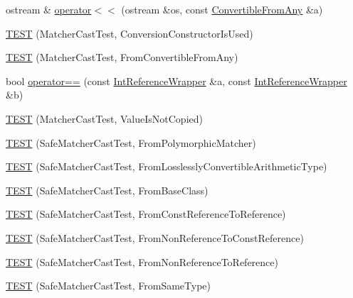 \begin{DoxyCompactItemize}
\item 
ostream \& \hyperlink{namespacetesting_1_1gmock__matchers__test_a2a2abd1e49c201ae26ed96211d4225eb}{operator$<$$<$} (ostream \&os, const \hyperlink{structtesting_1_1gmock__matchers__test_1_1_convertible_from_any}{Convertible\+From\+Any} \&a)
\item 
\hyperlink{namespacetesting_1_1gmock__matchers__test_a42e4d7d26704516436281897cb41bb1b}{T\+E\+ST} (Matcher\+Cast\+Test, Conversion\+Constructor\+Is\+Used)
\item 
\hyperlink{namespacetesting_1_1gmock__matchers__test_ae51787fccc0f0a27e3725039c6cd48dc}{T\+E\+ST} (Matcher\+Cast\+Test, From\+Convertible\+From\+Any)
\item 
bool \hyperlink{namespacetesting_1_1gmock__matchers__test_a33c068c32bf5118e5be92771b146db77}{operator==} (const \hyperlink{structtesting_1_1gmock__matchers__test_1_1_int_reference_wrapper}{Int\+Reference\+Wrapper} \&a, const \hyperlink{structtesting_1_1gmock__matchers__test_1_1_int_reference_wrapper}{Int\+Reference\+Wrapper} \&b)
\item 
\hyperlink{namespacetesting_1_1gmock__matchers__test_ae99c08c8a815964b61f98a4785cf79b5}{T\+E\+ST} (Matcher\+Cast\+Test, Value\+Is\+Not\+Copied)
\item 
\hyperlink{namespacetesting_1_1gmock__matchers__test_a29c04361c022a71711dbf9d3cf2a5050}{T\+E\+ST} (Safe\+Matcher\+Cast\+Test, From\+Polymorphic\+Matcher)
\item 
\hyperlink{namespacetesting_1_1gmock__matchers__test_a70bbe53742db988a828d9e8201e34770}{T\+E\+ST} (Safe\+Matcher\+Cast\+Test, From\+Losslessly\+Convertible\+Arithmetic\+Type)
\item 
\hyperlink{namespacetesting_1_1gmock__matchers__test_a937469149aee65efde526091af1e4f78}{T\+E\+ST} (Safe\+Matcher\+Cast\+Test, From\+Base\+Class)
\item 
\hyperlink{namespacetesting_1_1gmock__matchers__test_a14ba7c67551222321056e4da6708010f}{T\+E\+ST} (Safe\+Matcher\+Cast\+Test, From\+Const\+Reference\+To\+Reference)
\item 
\hyperlink{namespacetesting_1_1gmock__matchers__test_ad53741423311d4f76d9d980f59ec8d65}{T\+E\+ST} (Safe\+Matcher\+Cast\+Test, From\+Non\+Reference\+To\+Const\+Reference)
\item 
\hyperlink{namespacetesting_1_1gmock__matchers__test_a362ce5b2b395dfd6363e4d80b49951f1}{T\+E\+ST} (Safe\+Matcher\+Cast\+Test, From\+Non\+Reference\+To\+Reference)
\item 
\hyperlink{namespacetesting_1_1gmock__matchers__test_a9fc149b429176a45e45267132ae901bd}{T\+E\+ST} (Safe\+Matcher\+Cast\+Test, From\+Same\+Type)

\end{DoxyCompactItemize}
